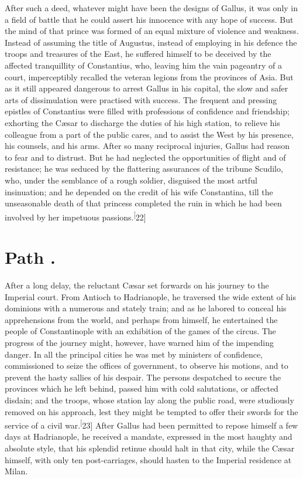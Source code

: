 After such a deed, whatever might have been the designs of
Gallus, it was only in a field of battle that he could assert his
innocence with any hope of success. But the mind of that prince
was formed of an equal mixture of violence and weakness. Instead
of assuming the title of Augustus, instead of employing in his
defence the troops and treasures of the East, he suffered himself
to be deceived by the affected tranquillity of Constantius, who,
leaving him the vain pageantry of a court, imperceptibly recalled
the veteran legions from the provinces of Asia. But as it still
appeared dangerous to arrest Gallus in his capital, the slow and
safer arts of dissimulation were practised with success. The
frequent and pressing epistles of Constantius were filled with
professions of confidence and friendship; exhorting the Cæsar to
discharge the duties of his high station, to relieve his
colleague from a part of the public cares, and to assist the West
by his presence, his counsels, and his arms. After so many
reciprocal injuries, Gallus had reason to fear and to distrust.
But he had neglected the opportunities of flight and of
resistance; he was seduced by the flattering assurances of the
tribune Scudilo, who, under the semblance of a rough soldier,
disguised the most artful insinuation; and he depended on the
credit of his wife Constantina, till the unseasonable death of
that princess completed the ruin in which he had been involved by
her impetuous passions.\textsuperscript[22]


\section{Path \thesection.}

After a long delay, the reluctant Cæsar set forwards on his
journey to the Imperial court. From Antioch to Hadrianople, he
traversed the wide extent of his dominions with a numerous and
stately train; and as he labored to conceal his apprehensions
from the world, and perhaps from himself, he entertained the
people of Constantinople with an exhibition of the games of the
circus. The progress of the journey might, however, have warned
him of the impending danger. In all the principal cities he was
met by ministers of confidence, commissioned to seize the offices
of government, to observe his motions, and to prevent the hasty
sallies of his despair. The persons despatched to secure the
provinces which he left behind, passed him with cold salutations,
or affected disdain; and the troops, whose station lay along the
public road, were studiously removed on his approach, lest they
might be tempted to offer their swords for the service of a civil
war.\textsuperscript[23] After Gallus had been permitted to repose himself a few
days at Hadrianople, he received a mandate, expressed in the most
haughty and absolute style, that his splendid retinue should halt
in that city, while the Cæsar himself, with only ten
post-carriages, should hasten to the Imperial residence at Milan.

